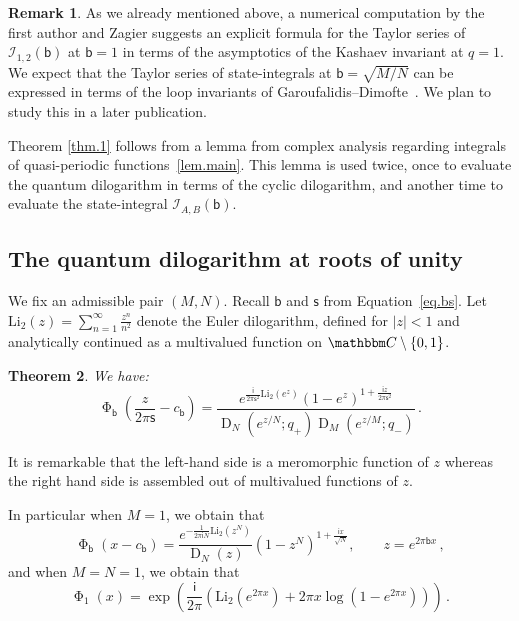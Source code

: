 \documentclass[12pt]{amsart}
\newtheorem{theorem}{Theorem}[section]
\theoremstyle{definition}
\newtheorem{remark}[theorem]{Remark}
\def\BC{\mathbbm C}
\def\calI{\mathcal I}
\def\Li{\mathrm{Li}}
\newcommand{\im}{\mathsf{i}}
\newcommand{\fad}[1]{\operatorname{\Phi}_{#1}}
\begin{document}
\begin{remark}
\label{rem.taylor}
As we already mentioned above, a numerical computation by the first
author and Zagier suggests an explicit formula for the Taylor series
of $\calI_{1,2}(\mathsf{b})$ at $\mathsf{b}=1$ in terms of the asymptotics
of the Kashaev invariant at $q=1$. We expect that the Taylor series
of state-integrals at $\mathsf{b}=\sqrt{M/N}$ can be expressed in terms of
the loop invariants of Garoufalidis--Dimofte~\cite{DG2}. We plan to study
this in a later publication.
\end{remark}

Theorem \ref{thm.1} follows from a lemma from complex analysis
regarding integrals of quasi-periodic functions~\ref{lem.main}. This 
lemma is used twice, once to evaluate the quantum dilogarithm in terms of the 
cyclic dilogarithm, and another time to evaluate the state-integral 
$\calI_{A,B}(\mathsf{b})$.

\subsection{The quantum dilogarithm at roots of unity}
\label{sub.evalphi}

We fix an admissible pair $(M,N)$. Recall 
$\mathsf{b}$ and $\mathsf{s}$ from Equation~\eqref{eq.bs}.
Let $\Li_2(z)=\sum_{n=1}^\infty \frac{z^n}{n^2}$ denote the Euler dilogarithm,
defined for $|z|<1$ and analytically continued as a multivalued
function on $\BC\setminus\{0,1\}$.

\begin{theorem}
\label{thm.2}
We have:
\begin{equation}
\label{eq.Phieval}
\fad{\mathsf{b}}\!\left(\frac{z}{2\pi\mathsf{s}}-c_{\mathsf{b}}\right)=
\frac{e^{\frac{\im}{2\pi\mathsf{s}^2}\operatorname{Li_2}(e^{z})}
\left(1-e^z\right)^{1+\frac{\im z}{2\pi\mathsf{s}^2}}}{
\operatorname{D}_N(e^{z/N};q_+)\operatorname{D}_M(e^{z/M};q_-)} \,.
\end{equation}
\end{theorem}

It is remarkable that the left-hand side is a meromorphic function of $z$
whereas the right hand side is assembled out of multivalued functions
of $z$.

In particular when $M=1$, we obtain that
\begin{equation}
\label{eq.evalphiN}
\fad{\mathsf{b}}(x-c_{\mathsf{b}})= \frac{e^{-\frac{1}{2 \pi \im N}\Li_2(z^N)}}{
\operatorname{D}_N(z)}
(1-z^N)^{1+ \frac{\im x}{\sqrt{N}}}, \qquad z=e^{2 \pi \mathsf{b} x} \,,
\end{equation}
and when $M=N=1$, we obtain that
\begin{equation}
\label{eq.phi1}
\fad{1}(x)=\exp\left( \frac{\im}{2 \pi} \left( \Li_2(e^{2 \pi x})+2 \pi x
\log(1-e^{2 \pi x})\right)\right) \,.
\end{equation}
\end{document}
